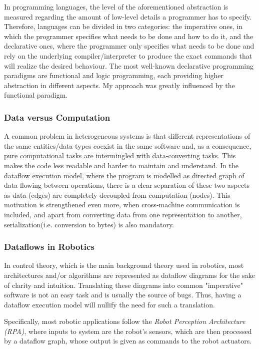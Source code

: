 \documentclass[sigplan,review,anonymous]{acmart}\settopmatter{printfolios=true}
\begin{document}
In programming languages, the level of the aforementioned abstraction is measured regarding the amount of low-level details a programmer has to specify. Therefore, languages can be divided in two categories: the imperative ones, in which the programmer specifies what needs to be done and how to do it, and the declarative ones, where the programmer only specifies what needs to be done and rely on the underlying compiler/interpreter to produce the exact commands that will realize the desired behaviour. The most well-known declarative programming paradigms are functional and logic programming, each providing higher abstraction in different aspects. My approach was greatly influenced by the functional paradigm.

\subsubsection{Data versus Computation}			

A common problem in heterogeneous systems is that different representations of the same entities/data-types coexist in the same software and, as a consequence, pure computational tasks are intermingled with data-converting tasks. This makes the code less readable and harder to maintain and understand. In the dataflow execution model, where the program is modelled as directed graph of data flowing between operations, there is a clear separation of these two aspects as data (edges) are completely decoupled from computation (nodes). This motivation is strengthened even more, when cross-machine communication is included, and apart from converting data from one representation to another, serialization(i.e. conversion to bytes) is also mandatory.

\subsubsection{Dataflows in Robotics}

In control theory, which is the main background theory used in robotics, most architectures and/or algorithms are represented as dataflow diagrams for the sake of clarity and intuition. Translating these diagrams into common "imperative" software is not an easy task and is usually the source of bugs. Thus, having a dataflow execution model will nullify the need for such a translation.

Specifically, most robotic applications follow the \textit{Robot Perception Architecture (RPA)}, where inputs to system are the robot's sensors, which are then processed by a dataflow graph, whose output is given as commands to the robot actuators.
\end{document}
